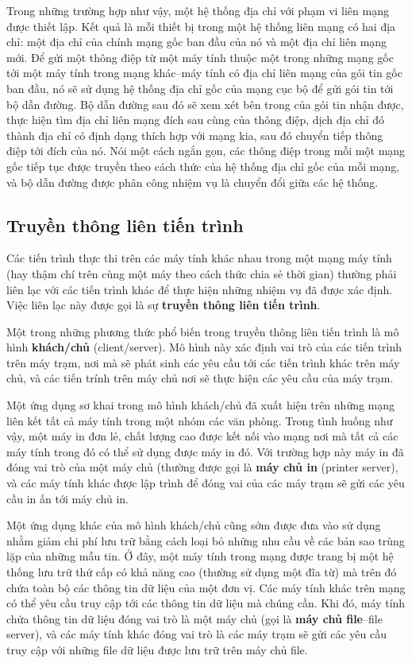 Trong những trường hợp như vậy, một hệ thống địa chỉ với phạm vi liên mạng được thiết
lập. Kết quả là mỗi thiết bị trong một hệ thống liên mạng có hai địa chỉ: một địa chỉ của
chính mạng gốc ban đầu của nó và một địa chỉ liên mạng mới. Để gửi một thông điệp từ một
máy tính thuộc một trong những mạng gốc tới một máy tính trong mạng khác--máy tính có địa chỉ
liên mạng của gói tin gốc ban đầu, nó sẽ sử dụng hệ thống địa chỉ gốc của mạng cục bộ để
gửi gói tin tới bộ dẫn đường. Bộ dẫn đường sau đó sẽ xem xét bên trong của gói tin nhận
được, thực hiện tìm địa chỉ liên mạng đích sau cùng của thông điệp, dịch địa chỉ đó thành
địa chỉ có định dạng thích hợp với mạng kia, sau đó chuyển tiếp thông điệp tới đích của
nó. Nói một cách ngắn gọn, các thông điệp trong mỗi một mạng gốc tiếp tục được truyền theo
cách thức của hệ thống địa chỉ gốc của mỗi mạng, và bộ dẫn đường được phân công nhiệm vụ
là chuyển đổi giữa các hệ thống.

\subsection*{Truyền thông liên tiến trình}
Các tiến trình thực thi trên các máy tính khác nhau trong một mạng
máy tính (hay thậm chí trên cùng một máy  theo cách thức chia sẻ thời gian)
thường phải liên lạc với các tiến trình khác  để thực hiện những nhiệm vụ đã được xác định. Việc liên lạc này được gọi là sự \textbf{truyền thông liên tiến trình}.

Một trong những phương thức phổ biến trong truyền thông liên tiến trình là mô hình
\textbf{khách/chủ} (client/server). Mô hình này xác định  vai trò của các tiến
trình trên máy trạm, nơi mà sẽ phát sinh các yêu cầu tới các tiến trình khác trên máy chủ, và các tiến trính trên máy chủ  
nơi sẽ thực hiện các yêu cầu của máy trạm.

Một ứng dụng sơ khai trong mô hình khách/chủ đã xuất hiện trên những mạng liên kết tất cả
máy tính trong một nhóm các văn phòng. Trong tình huống như vậy, một máy in đơn lẻ, chất
lượng cao được kết nối vào mạng nơi mà tất cả các máy tính trong đó có thể sử dụng được
máy in đó. Với trường hợp này máy in đã đóng vai trò của một máy chủ (thường được gọi là
\textbf{máy chủ in} (printer server), và các máy tính khác được lập trình để đóng vai của
các máy trạm sẽ gửi các yêu cầu in ấn tới máy chủ in.

Một ứng dụng khác của mô hình khách/chủ cũng sớm được đưa vào sử dụng nhằm giảm chi phí
lưu trữ bằng cách loại bỏ những nhu cầu về các bản sao trùng lặp của những mẫu tin. Ở đây,
một máy tính trong mạng được trang bị một hệ thống lưu trữ thứ cấp có khả năng cao (thường
sử dụng một đĩa từ) mà trên đó chứa toàn bộ các thông tin dữ liệu của một đơn vị. Các máy
tính khác trên mạng có thể yêu cầu truy cập tới các thông tin dữ liệu mà chúng cần. Khi
đó, máy tính chứa thông tin dữ liệu đóng vai trò là một máy chủ (gọi là \textbf{máy chủ
  file}--file server), và các máy tính khác đóng vai trò là các máy trạm sẽ gửi các yêu
cầu truy cập với những file dữ liệu được lưu trữ trên máy chủ file.

